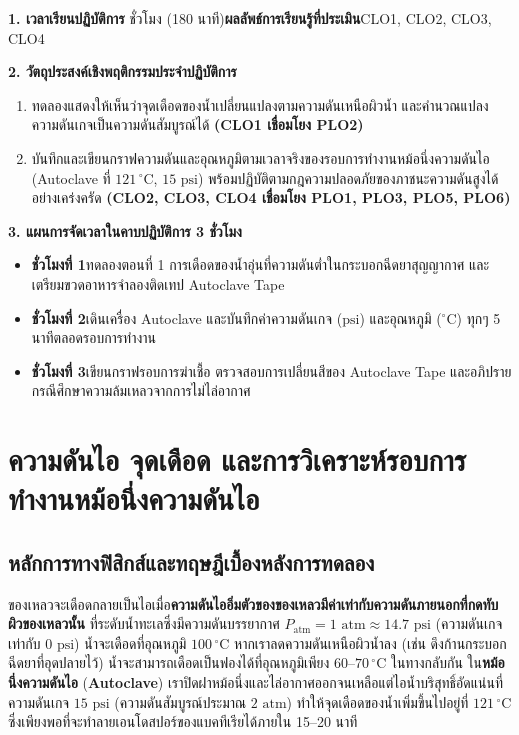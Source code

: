 \cleardoublepage
{}
\begin{planbox}
\noindent\textbf{1. เวลาเรียนปฏิบัติการ} ชั่วโมง (180 นาที)\quad \textbf{ผลลัพธ์การเรียนรู้ที่ประเมิน}\quad CLO1, CLO2, CLO3, CLO4

\noindent\textbf{2. วัตถุประสงค์เชิงพฤติกรรมประจำปฏิบัติการ}
\begin{enumerate}
    \item ทดลองแสดงให้เห็นว่าจุดเดือดของน้ำเปลี่ยนแปลงตามความดันเหนือผิวน้ำ และคำนวณแปลงความดันเกจเป็นความดันสัมบูรณ์ได้ \textbf{(CLO1 เชื่อมโยง PLO2)}
    \item บันทึกและเขียนกราฟความดันและอุณหภูมิตามเวลาจริงของรอบการทำงานหม้อนึ่งความดันไอ (Autoclave ที่ $121\,^\circ\text{C}$, $15\text{ psi}$) พร้อมปฏิบัติตามกฎความปลอดภัยของภาชนะความดันสูงได้อย่างเคร่งครัด \textbf{(CLO2, CLO3, CLO4 เชื่อมโยง PLO1, PLO3, PLO5, PLO6)}
\end{enumerate}

\noindent\textbf{3. แผนการจัดเวลาในคาบปฏิบัติการ 3 ชั่วโมง}
\begin{itemize}
    \item \textbf{ชั่วโมงที่ 1}\quad ทดลองตอนที่ 1 การเดือดของน้ำอุ่นที่ความดันต่ำในกระบอกฉีดยาสุญญากาศ และเตรียมขวดอาหารจำลองติดเทป Autoclave Tape
    \item \textbf{ชั่วโมงที่ 2}\quad เดินเครื่อง Autoclave และบันทึกค่าความดันเกจ ($\text{psi}$) และอุณหภูมิ ($^\circ\text{C}$) ทุกๆ 5 นาทีตลอดรอบการทำงาน
    \item \textbf{ชั่วโมงที่ 3}\quad เขียนกราฟรอบการฆ่าเชื้อ ตรวจสอบการเปลี่ยนสีของ Autoclave Tape และอภิปรายกรณีศึกษาความล้มเหลวจากการไม่ไล่อากาศ
\end{itemize}
\end{planbox}
\clearpage

\chapter{ความดันไอ จุดเดือด และการวิเคราะห์รอบการทำงานหม้อนึ่งความดันไอ}

\section{หลักการทางฟิสิกส์และทฤษฎีเบื้องหลังการทดลอง}

ของเหลวจะเดือดกลายเป็นไอเมื่อ\textbf{ความดันไออิ่มตัวของของเหลวมีค่าเท่ากับความดันภายนอกที่กดทับผิวของเหลวนั้น} ที่ระดับน้ำทะเลซึ่งมีความดันบรรยากาศ $P_{\text{atm}} = 1\text{ atm} \approx 14.7\text{ psi}$ (ความดันเกจเท่ากับ $0\text{ psi}$) น้ำจะเดือดที่อุณหภูมิ $100\,^\circ\text{C}$ หากเราลดความดันเหนือผิวน้ำลง (เช่น ดึงก้านกระบอกฉีดยาที่อุดปลายไว้) น้ำจะสามารถเดือดเป็นฟองได้ที่อุณหภูมิเพียง $60\text{--}70\,^\circ\text{C}$ ในทางกลับกัน ใน\textbf{หม้อนึ่งความดันไอ} (\textbf{Autoclave}) เราปิดฝาหม้อนึ่งและไล่อากาศออกจนเหลือแต่ไอน้ำบริสุทธิ์อัดแน่นที่ความดันเกจ $15\text{ psi}$ (ความดันสัมบูรณ์ประมาณ $2\text{ atm}$) ทำให้จุดเดือดของน้ำเพิ่มขึ้นไปอยู่ที่ $121\,^\circ\text{C}$ ซึ่งเพียงพอที่จะทำลายเอนโดสปอร์ของแบคทีเรียได้ภายใน 15--20 นาที

